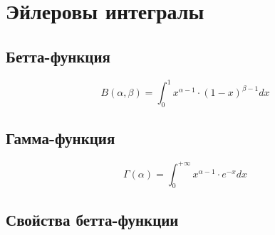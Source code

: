 \section{Эйлеровы интегралы}

\setcounter{subsection}{82}

\subsection{Бетта-функция}

\[
    \boxed{B(\alpha,\beta) = \int_{0}^{1}x^{\alpha - 1}\cdot (1-x)^{\beta-1}dx}
\]

\subsection{Гамма-функция}

\[
    \boxed{\Gamma(\alpha) = \int_{0}^{+\infty}x^{\alpha-1} \cdot e^{-x} dx}
\]

\subsection{Свойства бетта-функции}

